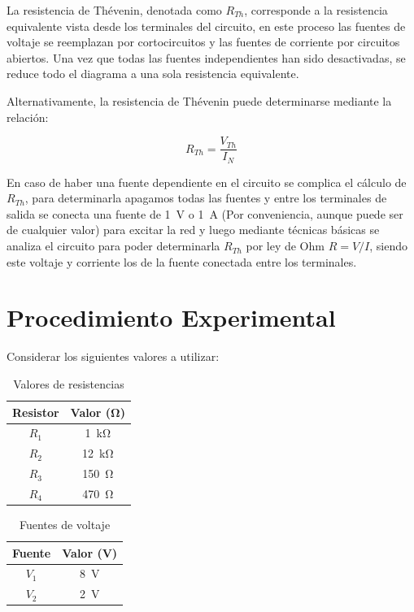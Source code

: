 \documentclass{article}
\begin{document}
    La resistencia de Thévenin, denotada como $R_{Th}$, corresponde a la resistencia equivalente vista desde los terminales del circuito, en este proceso las fuentes de voltaje se reemplazan por cortocircuitos y las fuentes de corriente por circuitos abiertos. Una vez que todas las fuentes independientes han sido desactivadas, se reduce todo el diagrama a una sola resistencia equivalente.

    Alternativamente, la resistencia de Thévenin puede determinarse mediante la relación:

    \[
        R_{Th} = \frac{V_{Th}}{I_N}
    \]

    En caso de haber una fuente dependiente en el circuito se complica el cálculo de $R_{Th}$, para determinarla apagamos todas las fuentes y entre los terminales de salida se conecta una fuente de \SI{1}{\volt} o \SI{1}{\ampere} (Por conveniencia, aunque puede ser de cualquier valor) para excitar la red y luego mediante técnicas básicas se analiza el circuito para poder determinarla $R_{Th}$ por ley de Ohm $R = V /I$, siendo este voltaje y corriente los de la fuente conectada entre los terminales.

    \section{Procedimiento Experimental}

    Considerar los siguientes valores a utilizar:

    \begin{table}[ht]
        \centering
        \begin{tabular}{|c|c|} %
            \midrule 
            Resistor    & Valor (\unit{\ohm})   \\
            \midrule
            $R_1$       & \SI{1}{\kilo\ohm}     \\
            $R_2$       & \SI{12}{\kilo\ohm}    \\
            $R_3$       & \SI{150}{\ohm}        \\
            $R_4$       & \SI{470}{\ohm}        \\
            \midrule
        \end{tabular}
        \caption{Valores de resistencias}
    \end{table}

    \begin{table}[ht]
        \centering
        \begin{tabular}{|c|c|} %
            \midrule 
            Fuente      & Valor (\unit{\volt})  \\
            \midrule
            $V_1$       & \SI{8}{\volt}         \\
            $V_2$       & \SI{2}{\volt}         \\
            \midrule
        \end{tabular}
        \caption{Fuentes de voltaje}
    \end{table}
\end{document}
